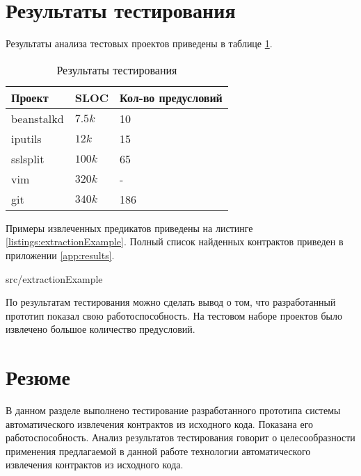 \section{Результаты тестирования}
Результаты анализа тестовых проектов приведены в таблице \ref{table:testing}.
\begin{table}
	\caption{Результаты тестирования}
	\begin{center}
	\begin{tabular}{|l|l|l|}
	\hline 
	\textbf{Проект} & \textbf{SLOC} & \textbf{Кол-во предусловий}	\\ 
	\hline 
	beanstalkd & $7.5k$ & 10 \\ 
	\hline 
	iputils & $12k$ & 15  \\ 
	\hline 
	sslsplit & $100k$  & 65\\ 
	\hline 
	vim & $320k$ & - \\ 
	\hline 
	git & $340k$ & 186 \\ 
	\hline 
	\end{tabular} 
	\end{center}
	\label{table:testing}
\end{table}

Примеры извлеченных предикатов приведены на листинге \ref{listings:extractionExample}. Полный список найденных контрактов приведен в приложении \ref{app:results}.


{src/extractionExample}

По результатам тестирования можно сделать вывод о том, что разработанный прототип показал свою работоспособность. На тестовом наборе проектов было извлечено большое количество предусловий.

\section{Резюме}
В данном разделе выполнено тестирование разработанного прототипа системы автоматического извлечения контрактов из исходного кода. Показана его работоспособность. Анализ результатов тестирования говорит о целесообразности применения предлагаемой в данной работе технологии автоматического извлечения контрактов из исходного кода.